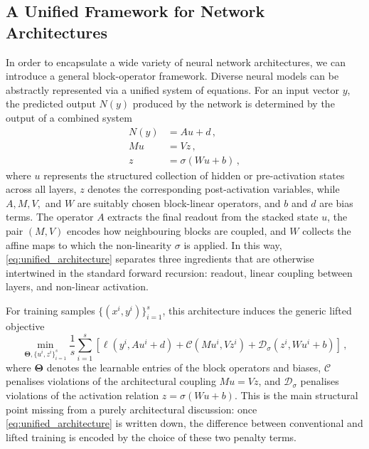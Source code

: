 \subsection{A Unified Framework for Network Architectures}
In order to encapsulate a wide variety of neural network architectures, we can introduce a general block-operator framework. Diverse neural models can be abstractly represented via a unified system of equations. For an input vector $y$, the predicted output $N(y)$ produced by the network is determined by the output of a combined system
\begin{align}
    \label{eq:unified_architecture}
    N(y) &= A u + d \, , \\
    M u &= V z \, , \\
    z &= \sigma(W u + b) \, ,
\end{align}
where $u$ represents the structured collection of hidden or pre-activation states across all layers, $z$ denotes the corresponding post-activation variables, while $A, M, V,$ and $W$ are suitably chosen block-linear operators, and $b$ and $d$ are bias terms. The operator $A$ extracts the final readout from the stacked state $u$, the pair $(M,V)$ encodes how neighbouring blocks are coupled, and $W$ collects the affine maps to which the non-linearity $\sigma$ is applied. In this way, \eqref{eq:unified_architecture} separates three ingredients that are otherwise intertwined in the standard forward recursion: readout, linear coupling between layers, and non-linear activation.

\noindent For training samples $\{(x^i,y^i)\}_{i=1}^s$, this architecture induces the generic lifted objective
\begin{equation}\label{eq:unified_lifted_objective}
    \min_{\mathbf{\Theta},\{u^i,z^i\}_{i=1}^s} \frac{1}{s}\sum_{i=1}^s \left[ \ell\left(y^i, A u^i + d\right) + \mathcal{C}\left(Mu^i, Vz^i\right) + \mathcal{D}_{\sigma}\left(z^i, Wu^i + b\right) \right] \, ,
\end{equation}
where $\mathbf{\Theta}$ denotes the learnable entries of the block operators and biases, $\mathcal{C}$ penalises violations of the architectural coupling $Mu=Vz$, and $\mathcal{D}_{\sigma}$ penalises violations of the activation relation $z=\sigma(Wu+b)$. This is the main structural point missing from a purely architectural discussion: once \eqref{eq:unified_architecture} is written down, the difference between conventional and lifted training is encoded by the choice of these two penalty terms.

